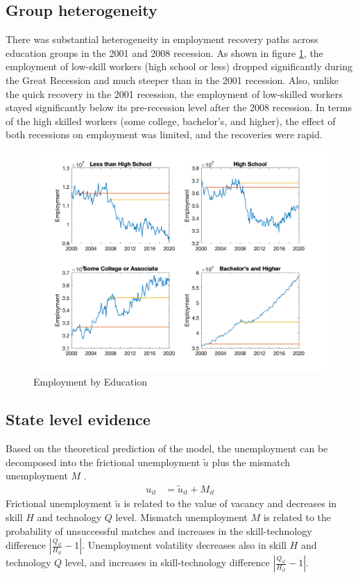 \documentclass[12pt]{article}
\newcommand{\1}{\mathbb{1}}
\begin{document}
\subsection{Group heterogeneity}
There was substantial heterogeneity in employment recovery paths across education groups in the 2001 and 2008 recession. As shown in figure \ref{Employment_Education}, the employment of low-skill workers (high school or less) dropped significantly during the Great Recession and much steeper than in the 2001 recession. Also, unlike the quick recovery in the 2001 recession, the employment of low-skilled workers stayed significantly below its pre-recession level after the 2008 recession. In terms of the high skilled workers (some college, bachelor's, and higher), the effect of both recessions on employment was limited, and the recoveries were rapid.  
\begin{figure}[h!]
\centering
\includegraphics[width=\textwidth]{Employment_Education}
\caption{Employment by Education}
\label{Employment_Education}
\end{figure}


\subsection{State level evidence}
Based on the theoretical prediction of the model, the unemployment can be decomposed into the frictional unemployment $\tilde{u}$ plus the mismatch unemployment $M$ .  
\begin{align*}
u_{it} &= \tilde{u}_{it}+M_{it} 
\end{align*}
Frictional unemployment $\tilde{u}$ is related to the value of vacancy and decreases in skill $H$ and technology $Q$ level. Mismatch unemployment $M$ is related to the probability of unsuccessful matches and increases in the skill-technology difference $|\frac{Q_{it}}{H_{it}}-1|$. Unemployment volatility decreases also in skill $H$ and technology $Q$ level, and increases in skill-technology difference $|\frac{Q_{it}}{H_{it}}-1|$. \\
\end{document}
